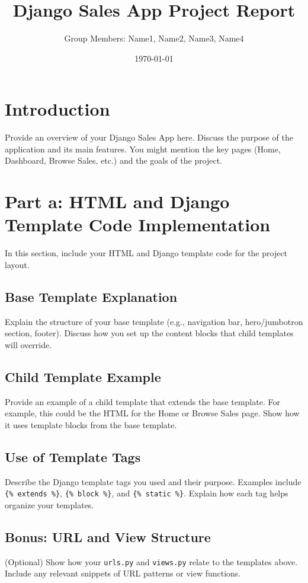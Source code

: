 \documentclass[12pt]{article}
\title{Django Sales App Project Report}
\author{Group Members: Name1, Name2, Name3, Name4}
\date{\today}
\begin{document}
\maketitle

\section{Introduction}
Provide an overview of your Django Sales App here. Discuss the purpose of the application and its main features. You might mention the key pages (Home, Dashboard, Browse Sales, etc.) and the goals of the project.

\section{Part a: HTML and Django Template Code Implementation}
In this section, include your HTML and Django template code for the project layout.

\subsection{Base Template Explanation}
Explain the structure of your base template (e.g., navigation bar, hero/jumbotron section, footer). Discuss how you set up the content blocks that child templates will override.

\subsection{Child Template Example}
Provide an example of a child template that extends the base template. For example, this could be the HTML for the Home or Browse Sales page. Show how it uses template blocks from the base template.

\subsection{Use of Template Tags}
Describe the Django template tags you used and their purpose. Examples include \verb|{% extends %}|, \verb|{% block %}|, and \verb|{% static %}|. Explain how each tag helps organize your templates.

\subsection{Bonus: URL and View Structure}
(Optional) Show how your \texttt{urls.py} and \texttt{views.py} relate to the templates above. Include any relevant snippets of URL patterns or view functions.
\end{document}
